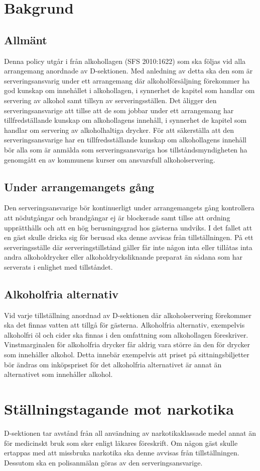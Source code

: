 \documentclass[]{dsekprotokoll}
\begin{document}
\section{Bakgrund}
\subsection{Allmänt}
Denna policy utgår i från alkohollagen (SFS 2010:1622) som ska följas vid alla arrangemang
anordnade av D-sektionen. Med anledning av detta ska den som är serveringsansvarig under ett
arrangemang där alkoholförsäljning förekommer ha god kunskap om innehållet i alkohollagen, i
synnerhet de kapitel som handlar om servering av alkohol samt tillsyn av serveringsställen. Det
åligger den serveringsansvarige att tillse att de som jobbar under ett arrangemang har tillfredställande kunskap om alkohollagens innehåll, i synnerhet de kapitel som handlar om servering
av alkoholhaltiga drycker. För att säkerställa att den serveringsansvarige har en tillfredsställande kunskap om alkohollagens innehåll bör alla som är anmälda som serveringsansvariga hos
tillståndsmyndigheten ha genomgått en av kommunens kurser om ansvarsfull alkoholservering.

\subsection{Under arrangemangets gång}
Den serveringsansvarige bör kontinuerligt under arrangemangets gång kontrollera att nödutgångar och brandgångar ej är blockerade samt tillse att ordning upprätthålls och att en hög berusningsgrad hos gästerna undviks. I det fallet att en gäst skulle dricka sig för berusad ska
denne avvisas från tillställningen.
På ett serveringsställe där serveringstillstånd gäller får inte någon inta eller tillåtas inta andra
alkoholdrycker eller alkoholdrycksliknande preparat än sådana som har serverats i enlighet
med tillståndet.

\subsection{Alkoholfria alternativ}
Vid varje tillställning anordnad av D-sektionen där alkoholservering förekommer ska det finnas
vatten att tillgå för gästerna. Alkoholfria alternativ, exempelvis alkoholfri öl och cider ska finnas
i den omfattning som alkohollagen föreskriver. Vinstmarginalen för alkoholfria drycker får
aldrig vara större än den för drycker som innehåller alkohol. Detta innebär exempelvis att
priset på sittningsbiljetter bör ändras om inköpspriset för det alkoholfria alternativet är annat
än alternativet som innehåller alkohol.

\section{Ställningstagande mot narkotika}
D-sektionen tar avstånd från all användning av narkotikaklassade medel annat än för medicinskt
bruk som sker enligt läkares föreskrift. Om någon gäst skulle ertappas med att missbruka
narkotika ska denne avvisas från tillställningen. Dessutom ska en polisanmälan göras av den
serveringsansvarige.
\end{document}
